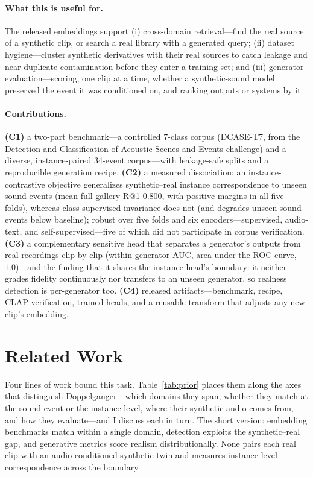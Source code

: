 \documentclass{article}
\begin{document}
\paragraph{What this is useful for.} The released embeddings support (i) cross-domain
retrieval---find the real source of a synthetic clip, or search a real library with a
generated query; (ii) dataset hygiene---cluster synthetic derivatives with their real sources
to catch leakage and near-duplicate contamination before they enter a training set; and (iii)
generator evaluation---scoring, one clip at a time, whether a synthetic-sound model preserved
the event it was conditioned on, and ranking outputs or systems by it.

\paragraph{Contributions.}
\textbf{(C1)} a two-part benchmark---a controlled 7-class corpus (DCASE-T7, from the Detection and Classification of Acoustic Scenes and Events challenge) and a diverse,
instance-paired 34-event corpus---with leakage-safe splits and a reproducible generation recipe.
\textbf{(C2)} a measured dissociation: an instance-contrastive objective generalizes synthetic--real
instance correspondence to unseen sound events (mean full-gallery R@1 $0.800$, with positive margins in all five folds),
whereas class-supervised invariance does not (and degrades unseen sound events below baseline);
robust over five folds and six encoders---supervised, audio-text, and self-supervised---five of
which did not participate in corpus verification.
\textbf{(C3)} a complementary sensitive head that separates a generator's outputs from real
recordings clip-by-clip (within-generator AUC, area under the ROC curve, $1.0$)---and the finding that it shares the instance
head's boundary: it neither grades fidelity continuously nor transfers to an unseen generator, so
realness detection is per-generator too. \textbf{(C4)} released artifacts---benchmark, recipe,
CLAP-verification, trained heads, and a reusable transform that adjusts any new clip's embedding.

\section{Related Work}
Four lines of work bound this task. Table~\ref{tab:prior} places them along the axes that distinguish
Doppelganger---which domains they span, whether they match at the sound event or the instance level,
where their synthetic audio comes from, and how they evaluate---and I discuss each in turn. The
short version: embedding benchmarks match within a single domain, detection exploits the
synthetic--real gap, and generative metrics score realism distributionally. None pairs each real clip
with an audio-conditioned synthetic twin and measures instance-level correspondence across the
boundary.
\end{document}
